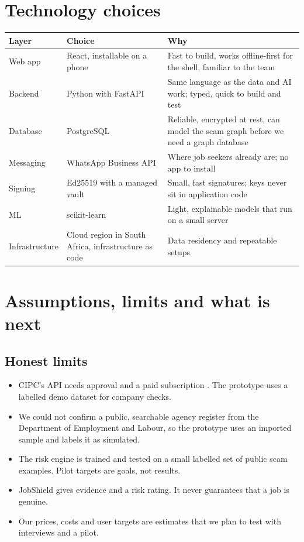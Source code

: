 \documentclass[11pt,a4paper]{article}
\newcommand{\tbl}[1]{\textbf{#1}}
\begin{document}
\section{Technology choices}
\begin{center}
\small
\begin{tabularx}{\textwidth}{@{}>{\raggedright\arraybackslash}p{3.0cm}>{\raggedright\arraybackslash}p{3.6cm}X@{}}
\toprule
\tbl{Layer} & \tbl{Choice} & \tbl{Why}\\
\midrule
Web app & React, installable on a phone & Fast to build, works offline-first for the shell, familiar to the team\\
Backend & Python with FastAPI & Same language as the data and AI work; typed, quick to build and test\\
Database & PostgreSQL & Reliable, encrypted at rest, can model the scam graph before we need a graph database\\
Messaging & WhatsApp Business API \cite{meta} & Where job seekers already are; no app to install\\
Signing & Ed25519 with a managed vault & Small, fast signatures; keys never sit in application code\\
ML & scikit-learn & Light, explainable models that run on a small server\\
Infrastructure & Cloud region in South Africa, infrastructure as code & Data residency and repeatable setups\\
\bottomrule
\end{tabularx}
\end{center}

\section{Assumptions, limits and what is next}
\label{sec:assumptions}
\subsection{Honest limits}
\begin{itemize}
  \item CIPC's API needs approval and a paid subscription \cite{cipc}. The prototype uses a labelled demo dataset for company checks.
  \item We could not confirm a public, searchable agency register from the Department of Employment and Labour, so the prototype uses an imported sample and labels it as simulated.
  \item The risk engine is trained and tested on a small labelled set of public scam examples. Pilot targets are goals, not results.
  \item JobShield gives evidence and a risk rating. It never guarantees that a job is genuine.
  \item Our prices, costs and user targets are estimates that we plan to test with interviews and a pilot.
\end{itemize}
\end{document}
